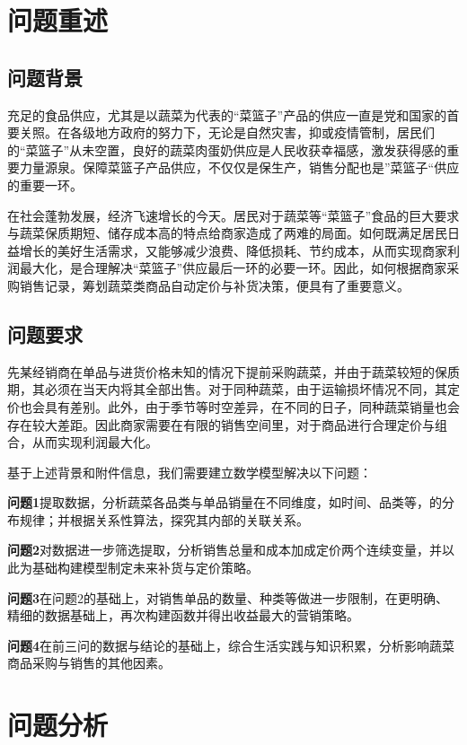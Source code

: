 \documentclass[withoutpreface,bwprint]{cumcmthesis} %
\begin{document}
		
		
		\section{问题重述}
		\subsection{问题背景}
		充足的食品供应，尤其是以蔬菜为代表的“菜篮子”产品的供应一直是党和国家的首要关照。在各级地方政府的努力下，无论是自然灾害，抑或疫情管制，居民们的“菜篮子”从未空置，良好的蔬菜肉蛋奶供应是人民收获幸福感，激发获得感的重要力量源泉。保障菜篮子产品供应，不仅仅是保生产，销售分配也是”菜篮子“供应的重要一环。
		
		在社会蓬勃发展，经济飞速增长的今天。居民对于蔬菜等“菜篮子”食品的巨大要求与蔬菜保质期短、储存成本高的特点给商家造成了两难的局面。如何既满足居民日益增长的美好生活需求，又能够减少浪费、降低损耗、节约成本，从而实现商家利润最大化，是合理解决“菜篮子”供应最后一环的必要一环。因此，如何根据商家采购销售记录，筹划蔬菜类商品自动定价与补货决策，便具有了重要意义。
		\subsection{问题要求}
	先某经销商在单品与进货价格未知的情况下提前采购蔬菜，并由于蔬菜较短的保质期，其必须在当天内将其全部出售。对于同种蔬菜，由于运输损坏情况不同，其定价也会具有差别。此外，由于季节等时空差异，在不同的日子，同种蔬菜销量也会存在较大差距。因此商家需要在有限的销售空间里，对于商品进行合理定价与组合，从而实现利润最大化。
	
	基于上述背景和附件信息，我们需要建立数学模型解决以下问题：
	
		\textbf{问题1}提取数据，分析蔬菜各品类与单品销量在不同维度，如时间、品类等，的分布规律；并根据关系性算法，探究其内部的关联关系。
	
		\textbf{问题2}对数据进一步筛选提取，分析销售总量和成本加成定价两个连续变量，并以此为基础构建模型制定未来补货与定价策略。
	
		\textbf{问题3}在问题2的基础上，对销售单品的数量、种类等做进一步限制，在更明确、精细的数据基础上，再次构建函数并得出收益最大的营销策略。
	
		\textbf{问题4}在前三问的数据与结论的基础上，综合生活实践与知识积累，分析影响蔬菜商品采购与销售的其他因素。
	\section{问题分析}
\end{document}

